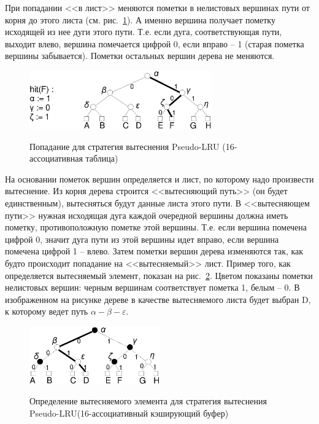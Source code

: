 \documentclass[14pt]{extreport}
\newcommand{\PseudoLRU}{\textsf{Pseudo-LRU}\xspace}
\begin{document}
При попадании <<в лист>> меняются пометки в нелистовых вершинах пути от корня до этого листа (см. рис.~\ref{pseudo_lru_hit}). А именно вершина получает пометку исходящей из нее дуги этого пути. Т.е. если дуга, соответствующая пути, выходит влево, вершина помечается цифрой 0, если вправо -- 1 (старая пометка вершины забывается). Пометки остальных вершин дерева не меняются.

\begin{figure}[h] \center
  \includegraphics[width=0.7\textwidth]{2.theor/plruhit}\\
  \caption{Попадание для стратегия вытеснения \PseudoLRU
  (16-ассоциативная таблица)}\label{pseudo_lru_hit}
\end{figure}

На основании пометок вершин определяется и лист, по которому надо произвести вытеснение.
Из корня дерева строится <<вытесняющий путь>> (он будет единственным), вытесняться будут данные листа этого пути. В <<вытесняющем пути>> нужная исходящая дуга каждой очередной вершины должна иметь пометку, противоположную пометке этой вершины. Т.е. если вершина помечена цифрой 0, значит дуга пути из этой вершины идет вправо, если вершина помечена цифрой 1 -- влево. Затем пометки вершин дерева изменяются так, как будто происходит попадание на <<вытесняемый>> лист. Пример того, как определяется вытесняемый элемент, показан на рис.~\ref{pseudo_lru_miss}. Цветом показаны пометки нелистовых вершин: черным вершинам соответствует пометка 1, белым
-- 0. В изображенном на рисунке дереве в качестве вытесняемого листа будет выбран D, к которому ведет путь $\alpha-\beta-\varepsilon$.

\begin{figure}[h] \center
  \includegraphics[width=0.5\textwidth]{2.theor/plrumiss}\\
  \caption{Определение вытесняемого элемента для стратегия вытеснения
  \PseudoLRU (16-ассоциативный кэширующий буфер)}\label{pseudo_lru_miss}
\end{figure}
\end{document}
